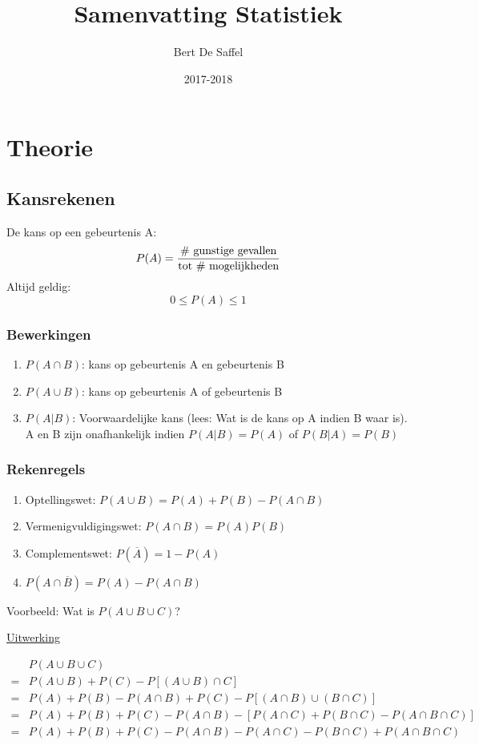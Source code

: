 \documentclass[12pt]{report}
\title{Samenvatting Statistiek}
\author{Bert De Saffel}
\date{2017-2018}
\newcommand{\example}[2]{
      \hrulefill
      
      Voorbeeld: #1
      
      \underline{Uitwerking}
      
      #2
      
      \hrulefill
  }
\begin{document}
\maketitle
\tableofcontents

\part{Theorie}
\chapter{Kansrekenen}
De kans op een gebeurtenis A:
$$P(A) = \frac{\hbox{\# gunstige gevallen}}{\hbox{tot \# mogelijkheden}}$$
Altijd geldig: 
$$0 \leq P(A) \leq 1$$
\section{Bewerkingen}
\begin{enumerate}
	\item $P(A \cap B)$: kans op gebeurtenis A en gebeurtenis B
	\item $P(A \cup B)$: kans op gebeurtenis A of gebeurtenis B
	\item $P(A|B)$: Voorwaardelijke kans (lees: Wat is de kans op A indien B waar is). A en B zijn onafhankelijk indien $P(A|B) = P(A)$ of $P(B|A) = P(B)$
\end{enumerate}
\section{Rekenregels}
\begin{enumerate}
	\item Optellingswet: $P(A \cup B) = P(A) + P(B) - P(A \cap B)$
	\item Vermenigvuldigingswet: $P(A \cap B) = P(A)P(B)$
	\item Complementswet: $P(\overline{A}) = 1 - P(A)$
	\item $P(A \cap \overline{B}) = P(A) - P(A \cap B)$
\end{enumerate}
\example{Wat is $P(A\cup B\cup C)$?}
{
	\begin{equation*}
		\begin{split}
			& P(A\cup B\cup C)\\
			= & P(A\cup B) + P(C) - P[(A \cup B) \cap C]\\
			= & P(A) + P(B) - P(A\cap B) + P(C) - P[(A \cap B) \cup (B \cap C)]\\
			= & P(A) + P(B) + P(C) - P(A \cap B) - [P(A \cap C) + P(B \cap C) - P(A \cap B \cap C)]\\
			= & P(A) + P(B) + P(C) - P(A \cap B) - P(A \cap C) - P(B \cap C) + P(A \cap B \cap C)
		\end{split}
	\end{equation*}
}
\end{document}
